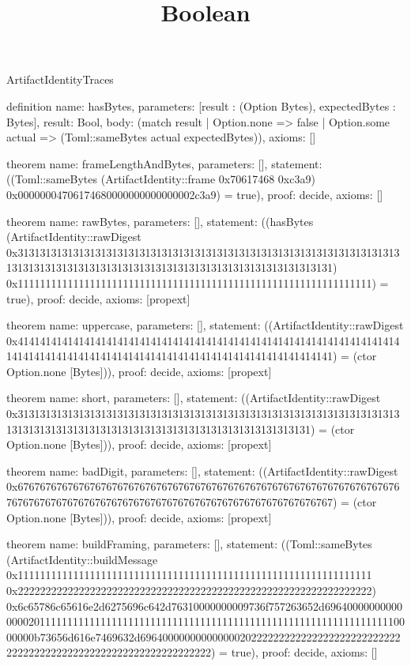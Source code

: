 \begin{lexlean}{ArtifactIdentityTraces}
\title{Boolean}
\begin{semanticmodule}

definition{
 name: hasBytes,
 parameters: [result : (Option Bytes), expectedBytes : Bytes],
 result: Bool,
 body: (match result | Option.none => false | Option.some actual => (Toml::sameBytes actual expectedBytes)),
 axioms: []
}

theorem{
 name: frameLengthAndBytes,
 parameters: [],
 statement: ((Toml::sameBytes (ArtifactIdentity::frame 0x70617468 0xc3a9) 0x00000004706174680000000000000002c3a9) = true),
 proof: decide{},
 axioms: []
}

theorem{
 name: rawBytes,
 parameters: [],
 statement: ((hasBytes (ArtifactIdentity::rawDigest 0x31313131313131313131313131313131313131313131313131313131313131313131313131313131313131313131313131313131313131313131313131313131) 0x1111111111111111111111111111111111111111111111111111111111111111) = true),
 proof: decide{},
 axioms: [propext]
}

theorem{
 name: uppercase,
 parameters: [],
 statement: ((ArtifactIdentity::rawDigest 0x41414141414141414141414141414141414141414141414141414141414141414141414141414141414141414141414141414141414141414141414141414141) = (ctor Option.none [Bytes])),
 proof: decide{},
 axioms: [propext]
}

theorem{
 name: short,
 parameters: [],
 statement: ((ArtifactIdentity::rawDigest 0x3131313131313131313131313131313131313131313131313131313131313131313131313131313131313131313131313131313131313131313131313131) = (ctor Option.none [Bytes])),
 proof: decide{},
 axioms: [propext]
}

theorem{
 name: badDigit,
 parameters: [],
 statement: ((ArtifactIdentity::rawDigest 0x67676767676767676767676767676767676767676767676767676767676767676767676767676767676767676767676767676767676767676767676767676767) = (ctor Option.none [Bytes])),
 proof: decide{},
 axioms: [propext]
}

theorem{
 name: buildFraming,
 parameters: [],
 statement: ((Toml::sameBytes (ArtifactIdentity::buildMessage 0x1111111111111111111111111111111111111111111111111111111111111111 0x2222222222222222222222222222222222222222222222222222222222222222) 0x6c65786c65616e2d6275696c642d76310000000009736f757263652d6964000000000000002011111111111111111111111111111111111111111111111111111111111111110000000b73656d616e7469632d696400000000000000202222222222222222222222222222222222222222222222222222222222222222) = true),
 proof: decide{},
 axioms: []
}


\end{semanticmodule}
\end{lexlean}
